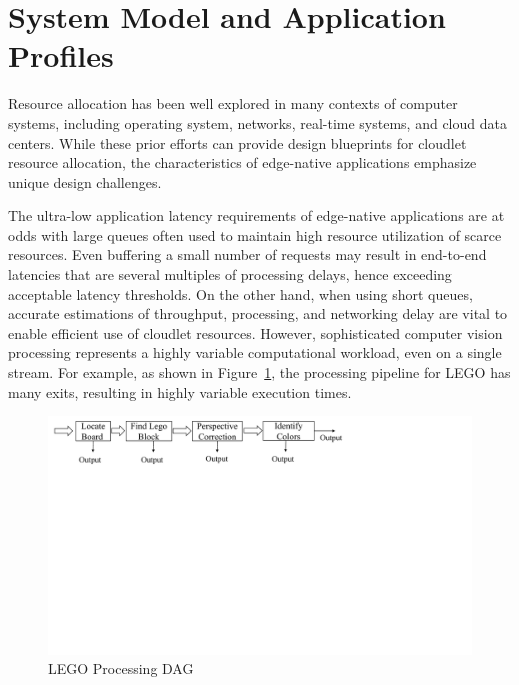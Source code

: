 \section{System Model and Application Profiles}


Resource allocation has been well explored in many contexts
of computer systems, including operating system, networks, real-time
systems, and cloud data centers.  While these prior efforts can
provide design blueprints for cloudlet resource allocation, the
characteristics of edge-native applications emphasize unique design
challenges.

The ultra-low application latency requirements of edge-native
applications are at odds with large queues often used to maintain high
resource utilization of scarce resources.  Even buffering a small
number of requests may result in end-to-end latencies that are several
multiples of processing delays, hence exceeding acceptable latency
thresholds.  On the other hand, when using short queues, accurate
estimations of throughput, processing, and networking delay are vital
to enable efficient use of cloudlet resources.  However, sophisticated
computer vision processing represents a highly variable computational
workload, even on a single stream. For example, as shown in
Figure~\ref{fig:lego-dag}, the processing pipeline for LEGO has many
exits, resulting in highly variable execution times.

\begin{figure}
\centering
\includegraphics[width=\linewidth, trim=0em 30em 20em 0em,clip]{FIGS/fig-lego-dag.pdf}
\caption{\small LEGO Processing DAG}
\label{fig:lego-dag}
\end{figure}

